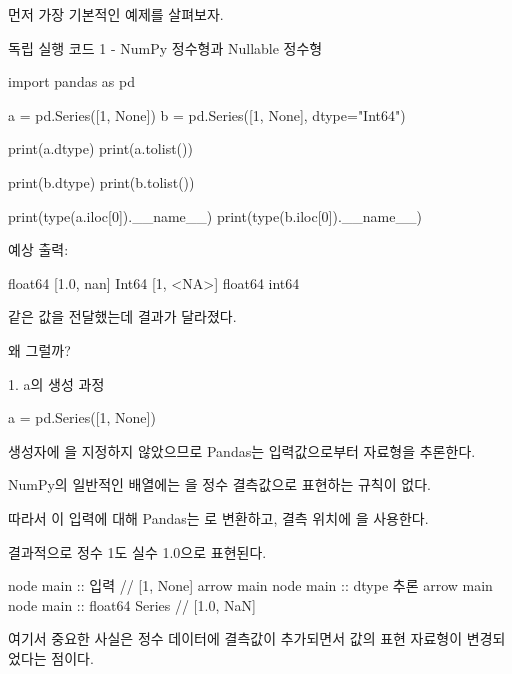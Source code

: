 먼저 가장 기본적인 예제를 살펴보자.

\begin{dhknote}
\begin{dhksmry}[centered]
독립 실행 코드 1 - NumPy 정수형과 Nullable 정수형
\end{dhksmry}
\end{dhknote}

\begin{dhkcode}
import pandas as pd

a = pd.Series([1, None])
b = pd.Series([1, None], dtype="Int64")

print(a.dtype)
print(a.tolist())

print(b.dtype)
print(b.tolist())

print(type(a.iloc[0]).__name__)
print(type(b.iloc[0]).__name__)
\end{dhkcode}

예상 출력:

\begin{dhkzsh}
float64
[1.0, nan]
Int64
[1, <NA>]
float64
int64
\end{dhkzsh}

같은 값을 전달했는데 결과가 달라졌다.

왜 그럴까?

\begin{dhknote}
\begin{dhksmry}[centered]
1. a의 생성 과정
\end{dhksmry}
\end{dhknote}

\begin{dhkcode}
a = pd.Series([1, None])
\end{dhkcode}

생성자에 을 지정하지 않았으므로 Pandas는 입력값으로부터 자료형을 추론한다.

NumPy의 일반적인  배열에는 을 정수 결측값으로 표현하는 규칙이 없다.

따라서 이 입력에 대해 Pandas는 로 변환하고, 결측 위치에 을 사용한다.

결과적으로 정수 1도 실수 1.0으로 표현된다.

\begin{dhkbranch}[in=8]
node main :: 입력 // [1, None]
arrow main
node main :: dtype 추론
arrow main
node main :: float64 Series // [1.0, NaN]
\end{dhkbranch}

여기서 중요한 사실은 정수 데이터에 결측값이 추가되면서 값의 표현 자료형이 변경되었다는 점이다.


